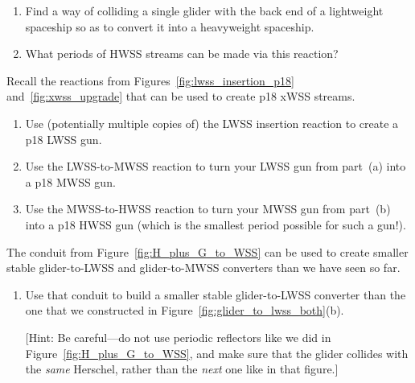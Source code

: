 \begin{multicols}{2}
\begin{problem}
		\begin{enumerate}[label=\bf\color{ocre}(\alph*)]
			\item Find a way of colliding a single glider with the back end of a lightweight spaceship so as to convert it into a heavyweight spaceship.
			
			\item What periods of HWSS streams can be made via this reaction?
		\end{enumerate}
	\end{problem}


	\mfilbreak
	
	
	\begin{problem}\label{exer:pseudo_xwss_gun_p18} 
		Recall the reactions from Figures~\ref{fig:lwss_insertion_p18} and~\ref{fig:xwss_upgrade} that can be used to create p18 xWSS streams.\smallskip
		
		\begin{enumerate}[label=\bf\color{ocre}(\alph*)]
			\item Use (potentially multiple copies of) the LWSS insertion reaction to create a p18 LWSS gun.
			
			\item Use the LWSS-to-MWSS reaction to turn your LWSS gun from part~(a) into a p18 MWSS gun.
			
			\item Use the MWSS-to-HWSS reaction to turn your MWSS gun from part~(b) into a p18 HWSS gun (which is the smallest period possible for such a gun!).
		\end{enumerate}
	\end{problem}
	
	
	\mfilbreak
	
	
	\begin{problem}\label{exer:smaller_G_to_LWSS} 
		The conduit from Figure~\ref{fig:H_plus_G_to_WSS} can be used to create smaller stable glider-to-LWSS and glider-to-MWSS converters than we have seen so far.\smallskip
		
		\begin{enumerate}[label=\bf\color{ocre}(\alph*)]
			\item Use that conduit to build a smaller stable glider-to-LWSS converter than the one that we constructed in Figure~\ref{fig:glider_to_lwss_both}(b).
			
			[Hint: Be careful---do not use periodic reflectors like we did in Figure~\ref{fig:H_plus_G_to_WSS}, and make sure that the glider collides with the \emph{same} Herschel, rather than the \emph{next} one like in that figure.]
			

\end{enumerate}
\end{problem}
\end{multicols}
